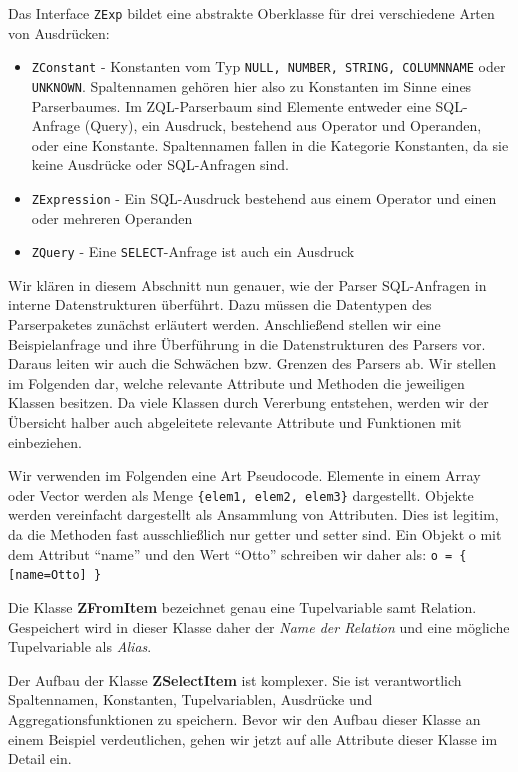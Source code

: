 Das Interface \verb|ZExp| bildet eine abstrakte Oberklasse für drei verschiedene Arten von Ausdrücken:

\begin{itemize}
\item \verb|ZConstant| - Konstanten vom Typ \verb|NULL, NUMBER, STRING, COLUMNNAME| oder \verb|UNKNOWN|. Spaltennamen gehören hier also zu Konstanten im Sinne eines Parserbaumes. Im ZQL-Parserbaum sind Elemente entweder eine SQL-Anfrage (Query), ein Ausdruck, bestehend aus Operator und Operanden, oder eine Konstante. Spaltennamen fallen in die Kategorie Konstanten, da sie keine Ausdrücke oder SQL-Anfragen sind. 
\item \verb|ZExpression| - Ein SQL-Ausdruck bestehend aus einem Operator und einen oder mehreren Operanden
\item \verb|ZQuery| - Eine \verb|SELECT|-Anfrage ist auch ein Ausdruck
\end{itemize}

Wir klären in diesem Abschnitt nun genauer, wie der Parser SQL-Anfragen in interne Datenstrukturen überführt.
Dazu müssen die Datentypen des Parserpaketes zunächst erläutert werden. Anschließend stellen wir eine Beispielanfrage und ihre Überführung in die Datenstrukturen des Parsers vor. Daraus leiten wir auch die Schwächen bzw. Grenzen des Parsers ab. Wir stellen im Folgenden dar, welche relevante Attribute und Methoden die jeweiligen Klassen besitzen. Da viele Klassen durch Vererbung entstehen, werden wir der Übersicht halber auch abgeleitete relevante Attribute und Funktionen mit einbeziehen. 

Wir verwenden im Folgenden eine Art Pseudocode. Elemente in einem Array oder Vector werden als Menge \verb|{elem1, elem2, elem3}| dargestellt. Objekte werden vereinfacht dargestellt als Ansammlung von Attributen. Dies ist legitim, da die Methoden fast ausschließlich nur getter und setter sind. Ein Objekt o mit dem Attribut ``name'' und den Wert ``Otto'' schreiben wir daher als: 
\verb|o = { [name=Otto] }|

Die Klasse \textbf{ZFromItem} bezeichnet genau eine Tupelvariable samt Relation. Gespeichert wird in dieser Klasse daher der \textit{Name der Relation} und eine mögliche Tupelvariable als \textit{Alias}.

Der Aufbau der Klasse \textbf{ZSelectItem} ist komplexer. Sie ist verantwortlich Spaltennamen, Konstanten, Tupelvariablen, Ausdrücke und Aggregationsfunktionen zu speichern. Bevor wir den Aufbau dieser Klasse an einem Beispiel verdeutlichen, gehen wir jetzt auf alle Attribute dieser Klasse im Detail ein.

